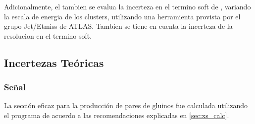 Adicionalmente, el tambien se evalua la incerteza en el termino soft de {\met}, variando
la escala de energia de los clusters, utilizando una herramienta provista por
el grupo Jet/Etmiss de ATLAS. %
Tambien se tiene en cuenta la incerteza de la resolucion en el termino soft.





\subsection{Incertezas Teóricas}\label{sec:theosyst}


\subsubsection{Señal}\label{sec:syst_signal}

La sección eficaz para la producción de pares de gluinos  fue calculada utilizando
el programa {\nllfast} de acuerdo a las recomendaciones explicadas en \cref{sec:xs_calc}.


